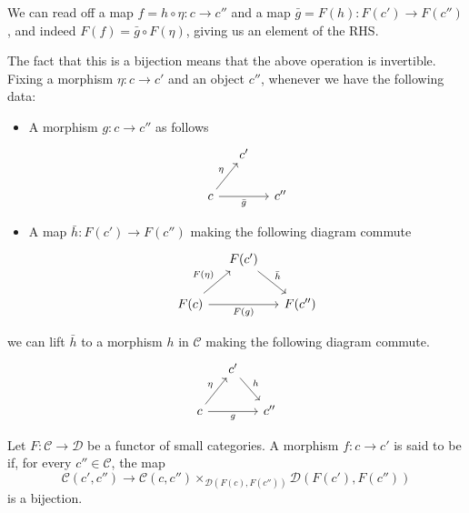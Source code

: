 \documentclass[main.tex]{subfiles}
\begin{document}
We can read off a map $f = h \circ \eta\colon c \to c''$ and a map $\bar{g} = F(h)\colon F(c') \to F(c'')$, and indeed $F(f) = \bar{g} \circ F(\eta)$, giving us an element of the RHS.

The fact that this is a bijection means that the above operation is invertible. Fixing a morphism $\eta\colon c \to c'$ and an object $c''$, whenever we have the following data:
\begin{itemize}
  \item A morphism $g\colon c \to c''$ as follows
    \begin{equation*}
      \begin{tikzcd}[column sep=small]
        & c'
        \\
        c
        \arrow[ur, "\eta"]
        \arrow[rr, swap, "\bar{g}"]
        && c''
      \end{tikzcd}
    \end{equation*}
  \item A map $\bar{h}\colon F(c') \to F(c'')$ making the following diagram commute
    \begin{equation*}
      \begin{tikzcd}[column sep=small]
        & F(c')
        \arrow[dr, "\bar{h}"]
        \\
        F(c)
        \arrow[ur, "F(\eta)"]
        \arrow[rr, swap, "F(g)"]
        && F(c'')
      \end{tikzcd}
    \end{equation*}
\end{itemize}
we can lift $\bar{h}$ to a morphism $h$ in $\mathcal{C}$ making the following diagram commute.
\begin{equation*}
  \begin{tikzcd}[column sep=small]
    & c'
    \arrow[dr, "h"]
    \\
    c
    \arrow[ur, "\eta"]
    \arrow[rr, swap, "g"]
    && c''
  \end{tikzcd}
\end{equation*}

\begin{definition}
  \label{def:cocartesian_morphismfibration}
  Let $F\colon \mathcal{C} \to \mathcal{D}$ be a functor of small categories. A morphism $f\colon c \to c'$ is said to be  if, for every $c'' \in \mathcal{C}$, the map
  \begin{equation*}
    \mathcal{C}(c', c'') \to \mathcal{C}(c, c'') \times_{\mathcal{D}(F(c), F(c''))} \mathcal{D}(F(c'), F(c''))
  \end{equation*}
  is a bijection.
\end{definition}
\end{document}
